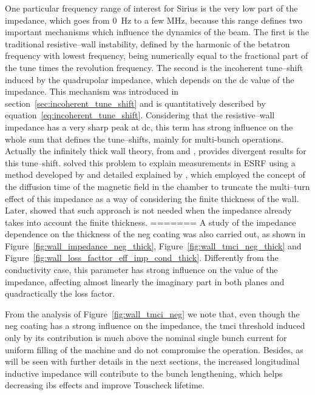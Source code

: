     One particular frequency range of interest for Sirius is the very low part of the impedance, which goes from \SI{0}{\hertz} to a few \si{\mega\hertz}, because this range defines two important mechanisms which influence the dynamics of the beam. The first is the traditional resistive--wall instability, defined by the harmonic of the betatron frequency with lowest frequency, being numerically equal to the fractional part of the tune times the revolution frequency. The second is the incoherent tune--shift induced by the quadrupolar impedance, which depends on the \gls{dc} value of the impedance. This mechanism was introduced in section~\ref{sec:incoherent_tune_shift} and is quantitatively described by equation~\eqref{eq:incoherent_tune_shift}. Considering that the resistive--wall impedance has a very sharp peak at \gls{dc}, this term has strong influence on the whole sum that defines the tune--shifts, mainly for multi-bunch operations.
    Actually the infinitely thick wall theory, from  and , provides divergent results for this tune--shift.  solved this problem to explain measurements in ESRF using a method developed by  and detailed explained by , which employed the concept of the diffusion time of the magnetic field in the chamber to truncate the multi--turn effect of this impedance as a way of considering the finite thickness of the wall. Later,  showed that such approach is not needed when the impedance already takes into account the finite thickness.
=======
    A study of the impedance dependence on the thickness of the \gls{neg} coating was also carried out, as shown in Figure~\ref{fig:wall_impedance_neg_thick}, Figure~\ref{fig:wall_tmci_neg_thick} and Figure~\ref{fig:wall_loss_facttor_eff_imp_cond_thick}. Differently from the conductivity case, this parameter has strong influence on the value of the impedance, affecting almost linearly the imaginary part in both planes and quadractically the loss factor.

    From the analysis of Figure~\ref{fig:wall_tmci_neg} we note that, even though the \gls{neg} coating has a strong influence on the impedance, the \gls{tmci} threshold induced only by its contribution is much above the nominal single bunch current for uniform filling of the machine and do not compromise the operation. Besides, as will be seen with further details in the next sections, the increased longitudinal inductive impedance will contribute to the bunch lengthening, which helps decreasing \gls{ibs} effects and improve Touscheck lifetime.

